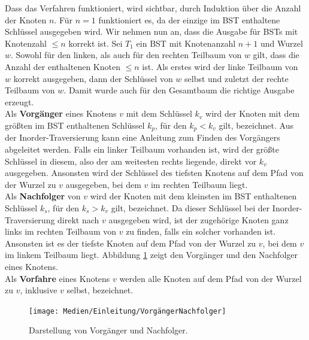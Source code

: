 \documentclass[a4paper,12pt]{article}
\begin{document}
\noindent Dass das Verfahren funktioniert, wird sichtbar, durch Induktion über die Anzahl der Knoten $n$.
Für $n = 1$ funktioniert es, da der einzige im BST enthaltene Schlüssel ausgegeben wird. Wir nehmen nun an, dass die Ausgabe für BSTs mit Knotenzahl $\leq n$ korrekt ist. Sei $T_1$ ein BST mit Knotenanzahl $n + 1$ und Wurzel $w$. Sowohl für den linken, als auch für den rechten Teilbaum von $w$ gilt, dass die Anzahl der enthaltenen Knoten $\leq n$ ist. Als erstes wird der linke Teilbaum von $w$ korrekt ausgegeben, dann der Schlüssel von $w$ selbst und zuletzt der rechte Teilbaum von $w$. Damit wurde auch für den Gesamtbaum die richtige
Ausgabe erzeugt. \\
Als \textbf{Vorgänger} eines Knotens $v$ mit dem Schlüssel $k_v$ wird der Knoten mit dem größten im BST enthaltenen Schlüssel $k_p$, für den $k_p < k_v$ gilt, bezeichnet. Aus der Inorder-Traversierung kann eine Anleitung zum Finden des Vorgängers abgeleitet werden. Falls ein linker Teilbaum vorhanden ist, wird der größte Schlüssel in diesem, also der am weitesten rechts liegende, direkt vor $k_v$ ausgegeben. Ansonsten wird der Schlüssel des tiefsten Knotens auf dem Pfad von der Wurzel zu $v$ ausgegeben, bei dem $v$ im rechten Teilbaum liegt. \\
Als \textbf{Nachfolger} von $v$ wird der Knoten mit dem kleinsten im BST enthaltenen Schlüssel $k_s$, für den $k_s > k_v$ gilt, bezeichnet. Da dieser Schlüssel bei der Inorder-Traversierung direkt nach $v$ ausgegeben wird, ist der zugehörige Knoten ganz links im rechten Teilbaum von $v$ zu finden, falls ein solcher vorhanden ist. Ansonsten ist es der tiefste Knoten auf dem Pfad von der Wurzel zu $v$, bei dem $v$ im linkem Teilbaum liegt. Abbildung \ref{fig:VorgängerNachfolger} zeigt den Vorgänger und den Nachfolger eines Knotens.\\
 Als \textbf{Vorfahre} eines Knotens $v$ werden alle Knoten auf dem Pfad von der Wurzel zu $v$, inklusive $v$ selbst, bezeichnet. 

\begin{figure}[H]
	\centering
	\texttt{[image: Medien/Einleitung/VorgängerNachfolger]}
	\caption{Darstellung von Vorgänger und Nachfolger. }
	\label{fig:VorgängerNachfolger}
\end{figure}
\end{document}
